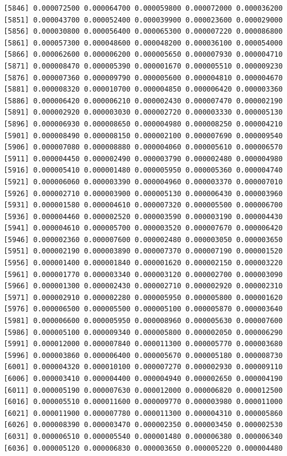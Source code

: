 \documentclass[]{article}
\begin{document}
\begin{verbatim}
 [5846] 0.000072500 0.000064700 0.000059800 0.000072000 0.000036200
 [5851] 0.000043700 0.000052400 0.000039900 0.000023600 0.000029000
 [5856] 0.000030800 0.000056400 0.000065300 0.000007220 0.000086800
 [5861] 0.000057300 0.000048600 0.000048200 0.000036100 0.000054000
 [5866] 0.000062600 0.000006200 0.000005650 0.000007930 0.000004710
 [5871] 0.000008470 0.000005390 0.000001670 0.000005510 0.000009230
 [5876] 0.000007360 0.000009790 0.000005600 0.000004810 0.000004670
 [5881] 0.000008320 0.000010700 0.000004850 0.000006420 0.000003360
 [5886] 0.000006420 0.000006210 0.000002430 0.000007470 0.000002190
 [5891] 0.000002920 0.000003030 0.000002720 0.000003330 0.000005130
 [5896] 0.000006930 0.000008650 0.000004980 0.000008250 0.000004210
 [5901] 0.000008490 0.000008150 0.000002100 0.000007690 0.000009540
 [5906] 0.000007080 0.000008880 0.000004060 0.000005610 0.000006570
 [5911] 0.000004450 0.000002490 0.000003790 0.000002480 0.000004980
 [5916] 0.000005410 0.000001480 0.000005950 0.000005360 0.000004740
 [5921] 0.000006060 0.000003390 0.000004960 0.000003370 0.000007010
 [5926] 0.000002710 0.000003900 0.000005130 0.000006430 0.000003960
 [5931] 0.000001580 0.000004610 0.000007320 0.000005500 0.000006700
 [5936] 0.000004460 0.000002520 0.000003590 0.000003190 0.000004430
 [5941] 0.000004610 0.000005700 0.000003520 0.000007670 0.000006420
 [5946] 0.000002360 0.000007600 0.000002480 0.000003050 0.000003650
 [5951] 0.000002190 0.000003890 0.000007370 0.000007190 0.000001520
 [5956] 0.000001400 0.000001840 0.000001620 0.000002150 0.000003220
 [5961] 0.000001770 0.000003340 0.000003120 0.000002700 0.000003090
 [5966] 0.000001300 0.000002430 0.000002710 0.000002920 0.000002310
 [5971] 0.000002910 0.000002280 0.000005950 0.000005800 0.000001620
 [5976] 0.000006500 0.000005500 0.000005100 0.000005870 0.000003640
 [5981] 0.000006600 0.000005950 0.000008960 0.000005630 0.000007600
 [5986] 0.000005100 0.000009340 0.000005800 0.000002050 0.000006290
 [5991] 0.000012000 0.000007840 0.000011300 0.000005770 0.000003680
 [5996] 0.000003860 0.000006400 0.000005670 0.000005180 0.000008730
 [6001] 0.000004320 0.000010100 0.000007270 0.000002930 0.000009110
 [6006] 0.000003410 0.000004400 0.000004940 0.000002650 0.000004190
 [6011] 0.000005190 0.000007630 0.000012000 0.000006820 0.000012500
 [6016] 0.000005510 0.000011600 0.000009770 0.000003980 0.000011000
 [6021] 0.000011900 0.000007780 0.000011300 0.000004310 0.000005860
 [6026] 0.000008390 0.000003470 0.000002350 0.000003450 0.000002530
 [6031] 0.000006510 0.000005540 0.000001480 0.000006380 0.000006340
 [6036] 0.000005120 0.000006830 0.000003650 0.000005220 0.000004480

\end{verbatim}
\end{document}
